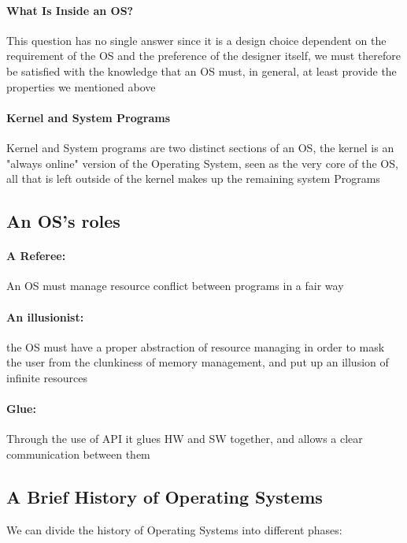 \documentclass[openright, twoside]{report}
\theoremstyle{definition}
\theoremstyle{example}
\begin{document}
	\paragraph{What Is Inside an OS?} This question has no single answer
	since it is a design choice dependent on the requirement of the OS
	and the preference of the designer itself, we must therefore be satisfied
	with the knowledge that an OS must, in general, at least provide the
	properties we mentioned above

	\paragraph{Kernel and System Programs}\label{par:kernel}
	Kernel and System programs are two distinct sections of an OS,
	the kernel is an "always online" version of the Operating System, seen as the
	very core of the OS, all that is left outside of the kernel makes up the remaining
	system Programs

	\subsection{An OS's roles}

	\paragraph{A Referee:} An OS must manage resource conflict
	between programs in a fair way

	\paragraph{An illusionist:} the OS must have a proper abstraction
	of resource managing in order to mask the user from the clunkiness of
	memory management, and put up an illusion of infinite resources

	\paragraph{Glue:} Through the use of API it glues HW and SW together, and allows
	a clear communication between them

	\subsection{A Brief History of Operating Systems}

	We can divide the history of Operating Systems into different phases:
\end{document}
